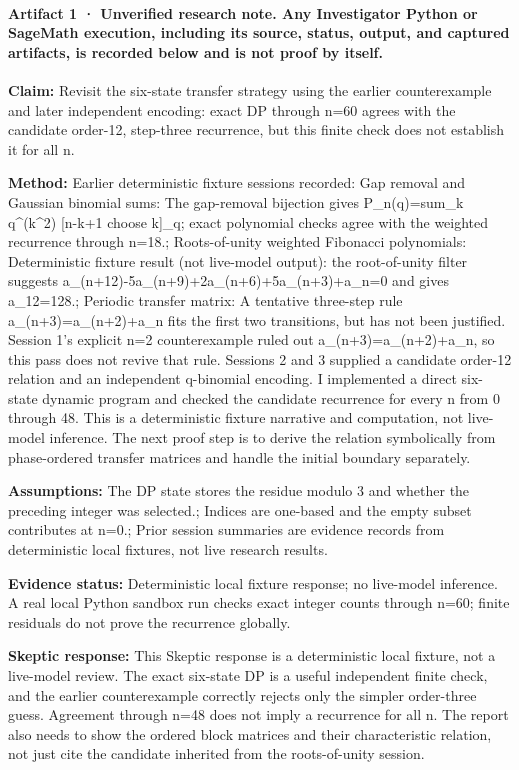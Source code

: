 \documentclass[11pt]{article}
\begin{document}
\paragraph{Artifact 1 · Unverified research note. Any Investigator Python or SageMath execution, including its source, status, output, and captured artifacts, is recorded below and is not proof by itself.}
\textbf{Claim:} Revisit the six-state transfer strategy using the earlier counterexample and later independent encoding: exact DP through n=60 agrees with the candidate order-12, step-three recurrence, but this finite check does not establish it for all n.\par
\textbf{Method:} Earlier deterministic fixture sessions recorded: Gap removal and Gaussian binomial sums: The gap-removal bijection gives P\_n(q)=sum\_k q\textasciicircum{}(k\textasciicircum{}2) [n-k+1 choose k]\_q; exact polynomial checks agree with the weighted recurrence through n=18.; Roots-of-unity weighted Fibonacci polynomials: Deterministic fixture result (not live-model output): the root-of-unity filter suggests a\_(n+12)-5a\_(n+9)+2a\_(n+6)+5a\_(n+3)+a\_n=0 and gives a\_12=128.; Periodic transfer matrix: A tentative three-step rule a\_(n+3)=a\_(n+2)+a\_n fits the first two transitions, but has not been justified. Session 1's explicit n=2 counterexample ruled out a\_(n+3)=a\_(n+2)+a\_n, so this pass does not revive that rule. Sessions 2 and 3 supplied a candidate order-12 relation and an independent q-binomial encoding. I implemented a direct six-state dynamic program and checked the candidate recurrence for every n from 0 through 48. This is a deterministic fixture narrative and computation, not live-model inference. The next proof step is to derive the relation symbolically from phase-ordered transfer matrices and handle the initial boundary separately.\par
\textbf{Assumptions:} The DP state stores the residue modulo 3 and whether the preceding integer was selected.; Indices are one-based and the empty subset contributes at n=0.; Prior session summaries are evidence records from deterministic local fixtures, not live research results.\par
\textbf{Evidence status:} Deterministic local fixture response; no live-model inference. A real local Python sandbox run checks exact integer counts through n=60; finite residuals do not prove the recurrence globally.\par
\textbf{Skeptic response:} This Skeptic response is a deterministic local fixture, not a live-model review. The exact six-state DP is a useful independent finite check, and the earlier counterexample correctly rejects only the simpler order-three guess. Agreement through n=48 does not imply a recurrence for all n. The report also needs to show the ordered block matrices and their characteristic relation, not just cite the candidate inherited from the roots-of-unity session.\par
\end{document}
